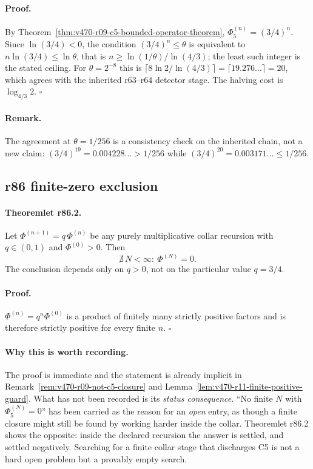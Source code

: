 \paragraph{Proof.}
By Theorem~\ref{thm:v470-r09-c5-bounded-operator-theorem},
\(\Phi_5^{(n)}=(3/4)^n\).  Since \(\ln(3/4)<0\), the condition
\((3/4)^n\le\theta\) is equivalent to \(n\ln(3/4)\le\ln\theta\), that is
\(n\ge\ln(1/\theta)/\ln(4/3)\); the least such integer is the stated ceiling.  For
\(\theta=2^{-8}\) this is \(\lceil 8\ln 2/\ln(4/3)\rceil=\lceil 19.276\ldots\rceil=20\),
which agrees with the inherited r63--r64 detector stage.  The halving cost is
\(\log_{4/3}2\). \(\square\)

\paragraph{Remark.}
The agreement at \(\theta=1/256\) is a consistency check on the inherited chain, not a new
claim: \((3/4)^{19}=0.004228\ldots>1/256\) while \((3/4)^{20}=0.003171\ldots\le 1/256\).

\subsection*{r86 finite-zero exclusion}
\label{subsec:r86-finite-zero-exclusion}

\paragraph{Theoremlet r86.2.}
Let \(\Phi^{(n+1)}=q\,\Phi^{(n)}\) be any purely multiplicative collar recursion with
\(q\in(0,1)\) and \(\Phi^{(0)}>0\).  Then
\[
\nexists\,N<\infty:\ \Phi^{(N)}=0 .
\]
The conclusion depends only on \(q>0\), not on the particular value \(q=3/4\).

\paragraph{Proof.}
\(\Phi^{(n)}=q^{n}\Phi^{(0)}\) is a product of finitely many strictly positive factors and is
therefore strictly positive for every finite \(n\). \(\square\)

\paragraph{Why this is worth recording.}
The proof is immediate and the statement is already implicit in
Remark~\ref{rem:v470-r09-not-c5-closure} and
Lemma~\ref{lem:v470-r11-finite-positive-guard}.  What has not been recorded is its
\emph{status consequence}.  ``No finite \(N\) with \(\Phi_5^{(N)}=0\)'' has been carried as
the reason for an \emph{open} entry, as though a finite closure might still be found by
working harder inside the collar.  Theoremlet r86.2 shows the opposite: inside the declared
recursion the answer is settled, and settled negatively.  Searching for a finite collar stage
that discharges C5 is not a hard open problem but a provably empty search.

